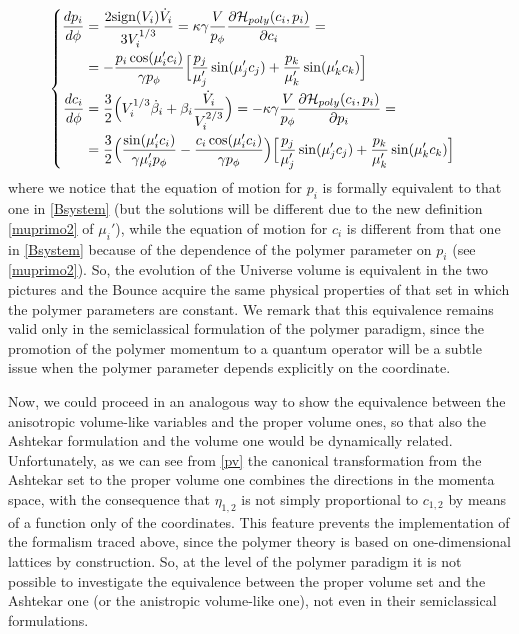 \documentclass[aps,prd,twocolumn,nofootinbib,superscriptaddress]{revtex4-2}
\newcommand{\sign}{\text{sign}}
\begin{document}
\begin{equation}
\begin{cases}
\begin{aligned}
{{dp_i}\over{d\phi}}&=\frac{2\sign(V_i)\dot{V}_i}{3V_i^{1/3}}=\kappa\gamma\frac{V}{p_\phi}\frac{\partial\mathcal{H}_{poly}(c_i,p_i)}{\partial c_i}=\\&=-{{p_i\cos(\mu'_ic_i)}\over\gamma p_{\phi}}\Big[{p_j\over{\mu'_j}}\sin(\mu'_jc_j)+{p_k\over{\mu'_k}}\sin(\mu'_kc_k)\Big]\\
{{dc_i}\over{d\phi}}&=\frac{3}{2}\Big(V_i^{1/3}\dot{\beta}_i+\beta_i\frac{\dot{V}_i}{V_i^{2/3}}\Big)=-\kappa\gamma\frac{V}{p_\phi}\frac{\partial\mathcal{H}_{poly}(c_i,p_i)}{\partial p_i}=\\&=\frac{3}{2}\Big({\sin(\mu'_ic_i)\over{\gamma\mu'_i p_{\phi}}}-{c_i\cos(\mu'_ic_i)\over{\gamma p_{\phi}}}\Big)\Big[{p_j\over{\mu'_j}}\sin(\mu'_jc_j)+{p_k\over{\mu'_k}}\sin(\mu'_kc_k)\Big]
\end{aligned}
\end{cases}
\end{equation}
where we notice that the equation of motion for $p_i$ is formally equivalent to that one in \eqref{Bsystem} (but the solutions will be different due to the new definition \eqref{muprimo2} of $\mu_i'$), while the equation of motion for $c_i$ is different from that one in \eqref{Bsystem} because of the dependence of the polymer parameter on $p_i$ (see \eqref{muprimo2}). So, the evolution of the Universe volume is equivalent in the two pictures and the Bounce acquire the same physical properties of that set in which the polymer parameters are constant. We remark that this equivalence remains valid only in the semiclassical formulation of the polymer paradigm, since the promotion of the polymer momentum to a quantum operator will be a subtle issue when the polymer parameter depends explicitly on the coordinate.

Now, we could proceed in an analogous way to show the equivalence between the anisotropic volume-like variables and the proper volume ones, so that also the Ashtekar formulation and the volume one would be dynamically related. Unfortunately, as we can see from \eqref{pv} the canonical transformation from the Ashtekar set to the proper volume one combines the directions in the momenta space, with the consequence that $\eta_{1,2}$ is not simply proportional to $c_{1,2}$ by means of a function only of the coordinates. This feature prevents the implementation of the formalism traced above, since the polymer theory is based on one-dimensional lattices by construction. So, at the level of the polymer paradigm it is not possible to investigate the equivalence between the proper volume set and the Ashtekar one (or the anistropic volume-like one), not even in their semiclassical formulations.
\end{document}
